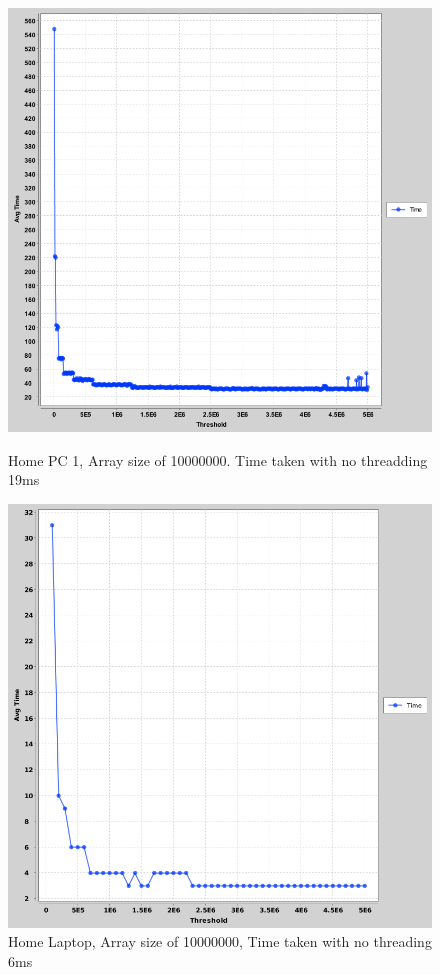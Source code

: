 \documentclass[a4paper, 12pt]{article}
\begin{document}
				\begin{figure}[H]
  \includegraphics[width=\linewidth]{thres-vs-time-pc-1.png}
  \caption{Home PC 1, Array size of 10000000. Time taken with no threadding 19ms}
\endminipage\hfill
{}
  \includegraphics[width=\linewidth]{thres-vs-time-laptop.png}
  \caption{Home Laptop, Array size of 10000000, Time taken with no threading 6ms}
\endminipage\hfill
		\end{figure}
		
\end{document}
